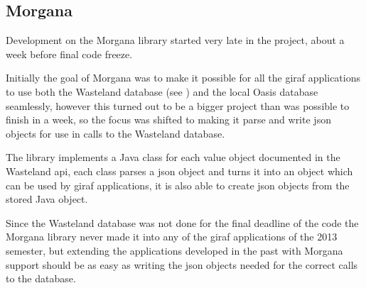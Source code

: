 \subsection{Morgana}
\label{sub:morgana:intro}
Development on the Morgana library started very late in the project, about a week before final code freeze.

Initially the goal of Morgana was to make it possible for all the \ac{giraf} applications to use both the Wasteland database (see ) and the local Oasis database seamlessly, however this turned out to be a bigger project than was possible to finish in a week, so the focus was shifted to making it parse and write \ac{json} objects for use in calls to the Wasteland database.

The library implements a Java class for each value object documented in the Wasteland \ac{api}, each class parses a \ac{json} object and turns it into an object which can be used by \ac{giraf} applications, it is also able to create \ac{json} objects from the stored Java object.

Since the Wasteland database was not done for the final deadline of the code the Morgana library never made it into any of the \ac{giraf} applications of the 2013 semester, but extending the applications developed in the past with Morgana support should be as easy as writing the \ac{json} objects needed for the correct calls to the database.
